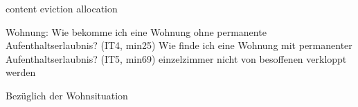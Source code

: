\item [Wohnen]
		content
		eviction
		allocation
		
		Wohnung:
    Wie bekomme ich eine Wohnung ohne permanente Aufenthaltserlaubnis? (IT4, min25)
    Wie finde ich eine Wohnung mit permanenter Aufenthaltserlaubnis? (IT5, min69)
    einzelzimmer
    nicht von besoffenen verkloppt werden

Bezüglich der Wohnsituation